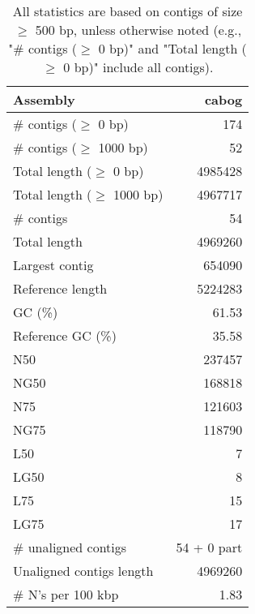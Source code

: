\documentclass[12pt,a4paper]{article}
\begin{document}
\begin{table}[ht]
\begin{center}
\caption{All statistics are based on contigs of size $\geq$ 500 bp, unless otherwise noted (e.g., "\# contigs ($\geq$ 0 bp)" and "Total length ($\geq$ 0 bp)" include all contigs).}
\begin{tabular}{|l*{1}{|r}|}
\hline
Assembly & cabog \\ \hline
\# contigs ($\geq$ 0 bp) & 174 \\ \hline
\# contigs ($\geq$ 1000 bp) & 52 \\ \hline
Total length ($\geq$ 0 bp) & 4985428 \\ \hline
Total length ($\geq$ 1000 bp) & 4967717 \\ \hline
\# contigs & 54 \\ \hline
Total length & 4969260 \\ \hline
Largest contig & 654090 \\ \hline
Reference length & 5224283 \\ \hline
GC (\%) & 61.53 \\ \hline
Reference GC (\%) & 35.58 \\ \hline
N50 & 237457 \\ \hline
NG50 & 168818 \\ \hline
N75 & 121603 \\ \hline
NG75 & 118790 \\ \hline
L50 & 7 \\ \hline
LG50 & 8 \\ \hline
L75 & 15 \\ \hline
LG75 & 17 \\ \hline
\# unaligned contigs & 54 + 0 part \\ \hline
Unaligned contigs length & 4969260 \\ \hline
\# N's per 100 kbp & 1.83 \\ \hline
\end{tabular}
\end{center}
\end{table}
\end{document}

